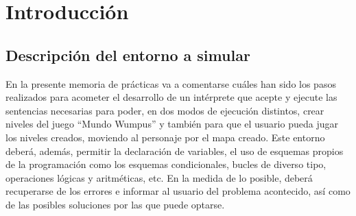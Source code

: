 \documentclass[a4paper,12pt,twoside,openright]{report}
\begin{document}
\renewcommand{\chaptermark}[1]{\markboth{\thechapter. #1}{}} %
\renewcommand{\sectionmark}[1]{\markright{\thesection. #1}} %

\newpage




\chapter{Introducción \label{intro}}
  \section{Descripción del entorno a simular}
  En la presente memoria de prácticas va a comentarse cuáles han sido los pasos realizados para acometer el desarrollo de un 
  intérprete que acepte y ejecute las sentencias necesarias para poder, en dos modos de ejecución distintos, crear niveles del 
  juego ``Mundo Wumpus'' y también para que el usuario pueda jugar los niveles creados, moviendo al personaje por el mapa 
  creado.
  Este entorno deberá, además, permitir la declaración de variables, el uso de esquemas propios de la programación como los 
  esquemas condicionales, bucles de diverso tipo, operaciones lógicas y aritméticas, etc. En la medida de lo posible, deberá 
  recuperarse de los errores e informar al usuario del problema acontecido, así como de las posibles soluciones por las que 
  puede optarse.
\end{document}
